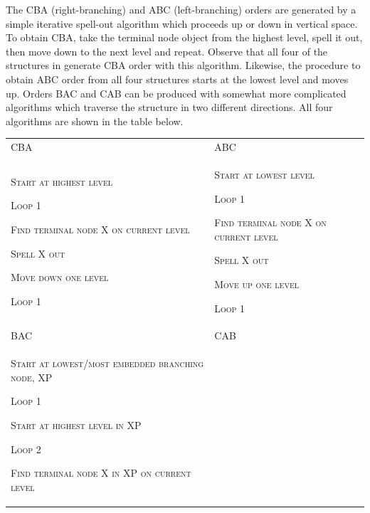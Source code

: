   The CBA (right-branching) and ABC (left-branching) orders are generated by a simple iterative spell-out algorithm which proceeds up or down in vertical space. To obtain CBA, take the terminal node object from the highest level, spell it out, then move down to the next level and repeat. Observe that all four of the structures in  generate CBA order with this algorithm. Likewise, the procedure to obtain ABC order from all four structures starts at the lowest level and moves up. Orders BAC and CAB can be produced with somewhat more complicated algorithms which traverse the structure in two different directions. All four algorithms are shown in the table below. 

\begin{tabularx}{\textwidth}{XX}
\lsptoprule
CBA & ABC\\
\textsc{Start} \textsc{at} \textsc{highest} \textsc{level}

\textsc{Loop} \textsc{1}

     \textsc{Find} \textsc{terminal} \textsc{node} \textsc{X} \textsc{on} \textsc{current} \textsc{level}

     \textsc{Spell} \textsc{X} \textsc{out}

     \textsc{Move} \textsc{down} \textsc{one} \textsc{level}

\textsc{Loop} \textsc{1} & \textsc{Start} \textsc{at} \textsc{lowest} \textsc{level}

\textsc{Loop} \textsc{1}

     \textsc{Find} \textsc{terminal} \textsc{node} \textsc{X} \textsc{on} \textsc{current} \textsc{level}

     \textsc{Spell} \textsc{X} \textsc{out}

     \textsc{Move} \textsc{up} \textsc{one} \textsc{level}

\textsc{Loop} \textsc{1}\\
BAC & CAB\\
\textsc{Start} \textsc{at} \textsc{lowest}\textsc{/}\textsc{most} \textsc{embedded} \textsc{branching} \textsc{node,} \textsc{XP}

\textsc{Loop} \textsc{1}

      \textsc{Start} \textsc{at} \textsc{highest} \textsc{level} \textsc{in} \textsc{XP}

      \textsc{Loop} \textsc{2}

         \textsc{Find} \textsc{terminal} \textsc{node} \textsc{X} \textsc{in} \textsc{XP} \textsc{on} \textsc{current} \textsc{level}


\end{tabularx}
